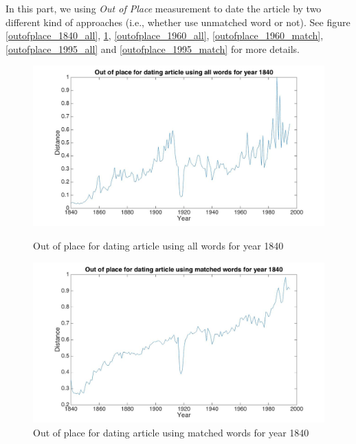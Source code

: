 In this part, we using \emph{Out of Place} measurement to date the article by two different kind of approaches (i.e., whether use unmatched word or not). See figure \ref{outofplace_1840_all}, \ref{outofplace_1840_match}, \ref{outofplace_1960_all}, \ref{outofplace_1960_match}, \ref{outofplace_1995_all} and \ref{outofplace_1995_match} for more details.

\begin{figure}[H]
    \begin{minipage}[b]{0.48\linewidth}
        \includegraphics[scale=0.15]{Pictures/date_articles/outofplace/1840_all.jpg}
        \caption{Out of place for dating article using all words for year 1840}
        \label{outofplace_1840_all}
    \end{minipage}\hfill
    \begin{minipage}[b]{0.5\linewidth}
        \includegraphics[scale=0.15]{Pictures/date_articles/outofplace/1840_partial.jpg}
        \caption{Out of place for dating article using matched words for year 1840}
        \label{outofplace_1840_match}
    \end{minipage}\hfill
\end{figure}

